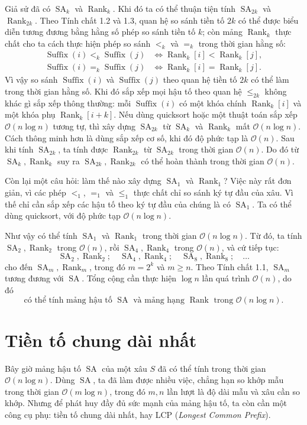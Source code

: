 \documentclass[11pt]{article}
\newcommand{\Oh}{\mathcal{O}}
\newcommand{\SA}{\operatorname{SA}}
\newcommand{\Rank}{\operatorname{Rank}}
\newcommand{\Suf}{\operatorname{Suffix}}
\begin{document}
Giả sử đã có \(\SA_k\) và \(\Rank_k\). Khi đó ta có thể thuận tiện tính
\(\SA_{2k}\) và \(\Rank_{2k}\). Theo Tính chất 1.2 và 1.3, quan hệ so sánh
tiền tố \(2k\) có thể được biểu diễn tương đương bằng hằng số phép so sánh
tiền tố \(k\); còn mảng \(\Rank_k\) thực chất cho ta cách thực hiện phép so
sánh \(<_k\) và \(=_k\) trong thời gian hằng số:
\[
\begin{aligned}
  \Suf(i)<_k\Suf(j)
  &\Longleftrightarrow \Rank_k[i]<\Rank_k[j],\\
  \Suf(i)=_k\Suf(j)
  &\Longleftrightarrow \Rank_k[i]=\Rank_k[j].
\end{aligned}
\]
Vì vậy so sánh \(\Suf(i)\) và \(\Suf(j)\) theo quan hệ tiền tố \(2k\) có thể
làm trong thời gian hằng số. Khi đó sắp xếp mọi hậu tố theo quan hệ
\(\le_{2k}\) không khác gì sắp xếp thông thường: mỗi \(\Suf(i)\) có một khóa
chính \(\Rank_k[i]\) và một khóa phụ \(\Rank_k[i+k]\). Nếu dùng quicksort
hoặc một thuật toán sắp xếp \(\Oh(n\log n)\) tương tự, thì xây dựng
\(\SA_{2k}\) từ \(\SA_k\) và \(\Rank_k\) mất \(\Oh(n\log n)\). Cách thông minh
hơn là dùng sắp xếp cơ số, khi đó độ phức tạp là \(\Oh(n)\). Sau khi tính
\(\SA_{2k}\), ta tính được \(\Rank_{2k}\) từ \(\SA_{2k}\) trong thời gian
\(\Oh(n)\). Do đó từ \(\SA_k,\Rank_k\) suy ra \(\SA_{2k},\Rank_{2k}\) có thể
hoàn thành trong thời gian \(\Oh(n)\).

Còn lại một câu hỏi: làm thế nào xây dựng \(\SA_1\) và \(\Rank_1\)? Việc này
rất đơn giản, vì các phép \(<_1\), \(=_1\) và \(\le_1\) thực chất chỉ so sánh
ký tự đầu của xâu. Vì thế chỉ cần sắp xếp các hậu tố theo ký tự đầu của chúng
là có \(\SA_1\). Ta có thể dùng quicksort, với độ phức tạp \(\Oh(n\log n)\).

Như vậy có thể tính \(\SA_1\) và \(\Rank_1\) trong thời gian \(\Oh(n\log n)\).
Từ đó, ta tính \(\SA_2,\Rank_2\) trong \(\Oh(n)\), rồi \(\SA_4,\Rank_4\)
trong \(\Oh(n)\), và cứ tiếp tục:
\[
  \SA_2,\Rank_2;\quad
  \SA_4,\Rank_4;\quad
  \SA_8,\Rank_8;\quad \ldots
\]
cho đến \(\SA_m,\Rank_m\), trong đó \(m=2^k\) và \(m\ge n\). Theo Tính chất
1.1, \(\SA_m\) tương đương với \(\SA\). Tổng cộng cần thực hiện \(\log n\)
lần quá trình \(\Oh(n)\), do đó
\[
  \text{có thể tính mảng hậu tố \(\SA\) và mảng hạng \(\Rank\) trong }
  \Oh(n\log n).
\]

\section{Tiền tố chung dài nhất}

Bây giờ mảng hậu tố \(\SA\) của một xâu \(S\) đã có thể tính trong thời gian
\(\Oh(n\log n)\). Dùng \(\SA\), ta đã làm được nhiều việc, chẳng hạn so khớp
mẫu trong thời gian \(\Oh(m\log n)\), trong đó \(m,n\) lần lượt là độ dài mẫu
và xâu cần so khớp. Nhưng để phát huy đầy đủ sức mạnh của mảng hậu tố, ta còn
cần một công cụ phụ: tiền tố chung dài nhất, hay LCP
(\textit{Longest Common Prefix}).
\end{document}

